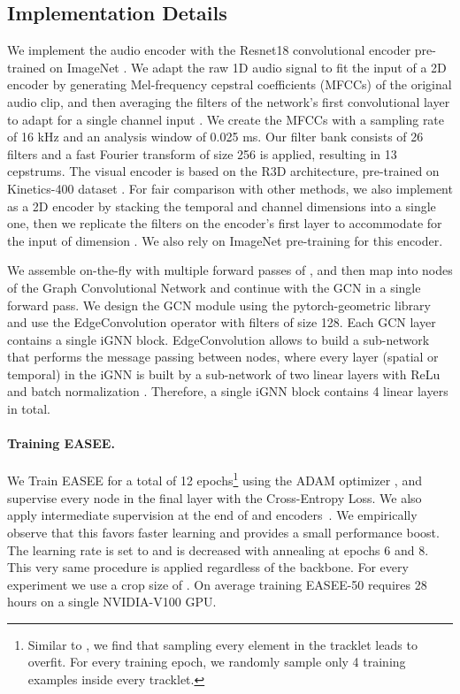 \documentclass[10pt,twocolumn,letterpaper]{article}
\begin{document}
\subsection{Implementation Details}
We implement  the audio encoder  with the Resnet18 convolutional encoder \cite{he2016deep} pre-trained on ImageNet \cite{deng2009imagenet}. We adapt the raw 1D audio signal to fit the input of a 2D encoder by generating Mel-frequency cepstral coefficients (MFCCs) of the original audio clip, and then averaging the filters of the network's first convolutional layer to adapt for a single channel input \cite{roth2020ava}. We create the MFCCs with a sampling rate of 16 kHz and an analysis window of 0.025 ms. Our filter bank consists of 26 filters and a fast Fourier transform of size 256 is applied, resulting in 13 cepstrums. The visual encoder  is based on the R3D architecture,  pre-trained on Kinetics-400 dataset \cite{kay2017kinetics}. For fair comparison with other methods, we also implement  as a 2D encoder by stacking the temporal and channel dimensions into a single one, then we replicate the filters on the encoder's first layer to accommodate for the input of dimension  \cite{simonyan2014two,roth2020ava}. We also rely on ImageNet pre-training \cite{deng2009imagenet} for this encoder. 

We assemble  on-the-fly with multiple forward passes of , and then map  into nodes of the Graph Convolutional Network and continue with the GCN in a single forward pass. We design the GCN module using the pytorch-geometric library \cite{Fey/Lenssen/2019} and use the EdgeConvolution operator \cite{wang2019dynamic} with filters of size 128. Each GCN layer contains a single iGNN block. EdgeConvolution allows to build a sub-network that performs the message passing between nodes, where every layer (spatial or temporal) in the iGNN is built by a sub-network of two linear layers with ReLu \cite{krizhevsky2012imagenet} and batch normalization \cite{ioffe2015batch}. Therefore, a single iGNN block contains 4 linear layers in total. 

\paragraph{Training EASEE.} We Train EASEE for a total of 12 epochs\footnote{Similar to \cite{alcazar2020active}, we find that sampling every element in the tracklet leads to overfit. For every training epoch, we randomly sample only 4 training examples inside every tracklet.} using the ADAM optimizer \cite{kingma2014adam}, and supervise every node in the final layer with the Cross-Entropy Loss. We also apply intermediate supervision at the end of  and  encoders~\cite{roth2020ava}. We empirically observe that this favors faster learning and provides a small performance boost. The learning rate is set to  and is decreased with annealing  at epochs 6 and 8. This very same procedure is applied regardless of the backbone. For every experiment we use a crop size of . On average training EASEE-50 requires 28 hours on a single NVIDIA-V100 GPU.
\end{document}
